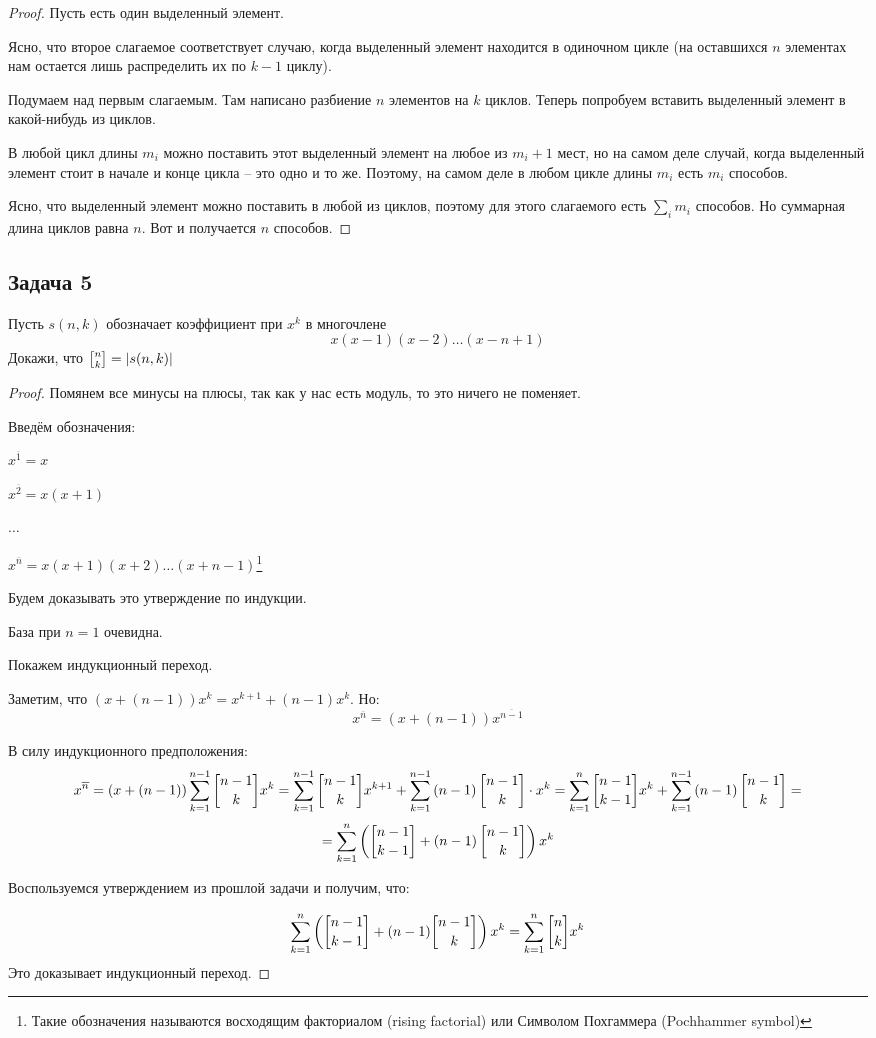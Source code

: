 \begin{proof}
Пусть есть один выделенный элемент.

Ясно, что второе слагаемое соответствует случаю, когда выделенный элемент находится в одиночном цикле (на оставшихся $n$ элементах нам остается лишь распределить их по $k - 1$ циклу).

Подумаем над первым слагаемым. Там написано разбиение $n$ элементов на $k$ циклов. Теперь попробуем вставить выделенный элемент в какой-нибудь из циклов. 

В любой цикл длины $m_i$ можно поставить этот выделенный элемент на любое из $m _i+ 1$ мест, но на самом деле случай, когда выделенный элемент стоит в начале и конце цикла -- это одно и то же. Поэтому, на самом деле в любом цикле длины $m_i$ есть $m_i$ способов. 

Ясно, что выделенный элемент можно поставить в любой из циклов, поэтому для этого слагаемого есть $\sum_{i} m_i$ способов. Но суммарная длина циклов равна $n$. Вот и получается $n$ способов.
\end{proof}

\subsection{Задача 5}

Пусть $s(n,k)$ обозначает коэффициент при $x^k$ в многочлене 
\[
x(x-1)(x-2)\ldots(x-n+1)
\]
Докажи, что $\stirling{n}{k} = |s(n,k)|$

\begin{proof}
Помянем все минусы на плюсы, так как у нас есть модуль, то это ничего не поменяет.

Введём обозначения:

$x^{\overline{1}} = x$

$x^{\overline{2}} = x(x+1)$

$\ldots$

$x^{\overline{n}} = x(x+1)(x+2)\ldots(x+n-1)$\footnote{Такие обозначения называются восходящим факториалом (rising factorial) или Символом Похгаммера (Pochhammer symbol)}

Будем доказывать это утверждение по индукции. 

База при $n = 1$ очевидна.

Покажем индукционный переход.

Заметим, что $(x+(n-1))x^k = x^{k+1} + (n-1)x^k$. Но: 
\[
x^{\overline{n}} = (x+(n-1))x^{\overline{n-1}}
\]

В силу индукционного предположения:
\[
x^{\overline{n}} = \lr{x+\lr{n-1}}\sum_{k=1}^{n-1}{\stirling{n-1}{k}}x^k = \sum_{k=1}^{n-1}{\stirling{n-1}{k}x^{k+1}} + \sum_{k=1}^{n-1}{\lr{n-1}\stirling{n-1}{k}} \cdot x^k = \sum_{k=1}^{n}{\stirling{n-1}{k-1}x^{k}} + \sum_{k=1}^{n-1}{\lr{n-1}\stirling{n-1}{k}} =
\]
\[
= \sum_{k=1}^{n}\lr{\stirling{n-1}{k-1} + \lr{n-1}\stirling{n-1}{k}}x^k
\]

Воспользуемся утверждением из прошлой задачи и получим, что:

\[
\sum_{k=1}^{n}\lr{\stirling{n-1}{k-1} + (n-1)\stirling{n-1}{k}}x^k = \sum_{k=1}^{n}\stirling{n}{k}x^k
\]
Это доказывает индукционный переход.
\end{proof}

